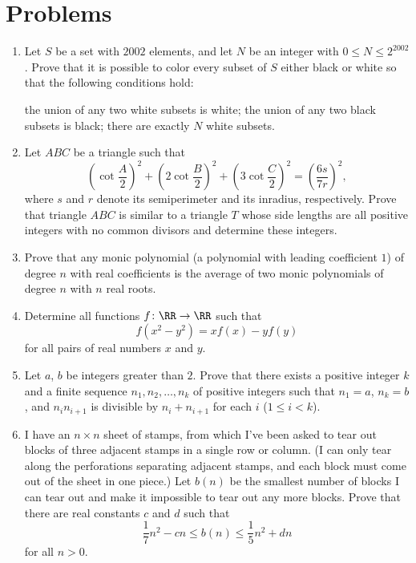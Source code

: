 \documentclass[11pt]{scrartcl}
\begin{document}
\section{Problems}
\begin{enumerate}[\bfseries 1.]
\item %
Let $S$ be a set with $2002$ elements,
and let $N$ be an integer with $0 \leq N \leq 2^{2002}$.
Prove that it is possible to color every subset of $S$
either black or white so that the following conditions hold:
\begin{enumerate}
  \ii[(a)] the union of any two white subsets is white;
  \ii[(b)] the union of any two black subsets is black;
  \ii[(c)] there are exactly $N$ white subsets.
\end{enumerate}

\item %
Let $ABC$ be a triangle such that
\[
  \left( \cot \frac{A}{2} \right)^2
  + \left( 2\cot \frac{B}{2} \right)^2
  + \left( 3\cot \frac{C}{2} \right)^2
  = \left( \frac{6s}{7r} \right)^2,
\]
where $s$ and $r$ denote its semiperimeter and its inradius, respectively.
Prove that triangle $ABC$ is similar to a triangle $T$ whose
side lengths are all positive integers
with no common divisors and determine these integers.

\item %
Prove that any monic polynomial (a polynomial with leading coefficient $1$)
of degree $n$ with real coefficients is the average
of two monic polynomials of degree $n$ with $n$ real roots.

\item %
Determine all functions $f \colon \RR \to \RR$ such that
\[ f(x^2 - y^2) = x f(x) - y f(y) \]
for all pairs of real numbers $x$ and $y$.

\item %
Let $a$, $b$ be integers greater than $2$.
Prove that there exists a positive integer $k$
and a finite sequence $n_1, n_2, \dots, n_k$ of
positive integers such that $n_1 = a$, $n_k = b$,
and $n_i n_{i+1}$ is divisible by $n_i + n_{i+1}$
for each $i$ ($1 \leq i < k$).

\item %
I have an $n \times n$ sheet of stamps, from which I've been asked
to tear out blocks of three adjacent stamps in a single row or column.
(I can only tear along the perforations separating adjacent stamps,
and each block must come out of the sheet in one piece.)
Let $b(n)$ be the smallest number of blocks I can tear out
and make it impossible to tear out any more blocks.
Prove that there are real constants $c$ and $d$ such that
\[ \frac{1}{7} n^2 - cn \leq b(n) \leq \frac{1}{5} n^2 + dn  \]
for all $n > 0$.

\end{enumerate}
\pagebreak
\end{document}
